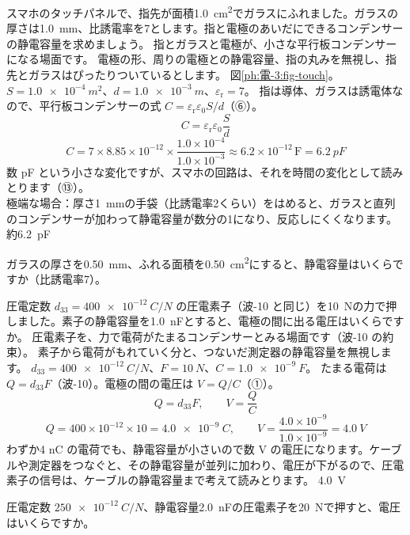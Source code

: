 \label{ph:電-3:ex13}
\begin{phreidai}[タッチパネルの静電容量の変化]
スマホのタッチパネルで、指先が面積\qty{1.0}{cm^2}でガラスにふれました。ガラスの厚さは\qty{1.0}{mm}、比誘電率を7とします。指と電極のあいだにできるコンデンサーの静電容量を求めましょう。
\phbamen
指とガラスと電極が、小さな平行板コンデンサーになる場面です。
\phmushi
電極の形、周りの電極との静電容量、指の丸みを無視し、指先とガラスはぴったりついているとします。
\phzu
図\ref{ph:電-3:fig-touch}。$S=\qty{1.0e-4}{m^2}$、$d=\qty{1.0e-3}{m}$、$\varepsilon_{\mathrm r}=7$。
\phriyu
指は導体、ガラスは誘電体なので、平行板コンデンサーの式 $C=\varepsilon_{\mathrm r}\varepsilon_0S/d$（⑥）。
\phtateru
\[C=\varepsilon_{\mathrm r}\varepsilon_0\frac{S}{d}\]
\phtoku
\[C=7\times8.85\times10^{-12}\times\frac{1.0\times10^{-4}}{1.0\times10^{-3}}\approx6.2\times10^{-12}\,\text{F}=\qty{6.2}{pF}\]
\phtashikame
数 pF という小さな変化ですが、スマホの回路は、それを時間の変化として読みとります（⑬）。\\
極端な場合：厚さ\qty{1}{mm}の手袋（比誘電率2くらい）をはめると、ガラスと直列のコンデンサーが加わって静電容量が数分の1になり、反応しにくくなります。
\kotae 約\qty{6.2}{pF}
\end{phreidai}
\begin{jibun}
ガラスの厚さを\qty{0.50}{mm}、ふれる面積を\qty{0.50}{cm^2}にすると、静電容量はいくらですか（比誘電率7）。
\end{jibun}

\label{ph:電-3:ex14}
\begin{phreidai}[圧電素子に出る電圧]
圧電定数 $d_{33}=\qty{400e-12}{C/N}$ の圧電素子（波-10 と同じ）を\qty{10}{N}の力で押しました。素子の静電容量を\qty{1.0}{nF}とすると、電極の間に出る電圧はいくらですか。
\phbamen
圧電素子を、力で電荷がたまるコンデンサーとみる場面です（波-10 の約束）。
\phmushi
素子から電荷がもれていく分と、つないだ測定器の静電容量を無視します。
\phzu
$d_{33}=\qty{400e-12}{C/N}$、$F=\qty{10}{N}$、$C=\qty{1.0e-9}{F}$。
\phriyu
たまる電荷は $Q=d_{33}F$（波-10）。電極の間の電圧は $V=Q/C$（①）。
\phtateru
\[Q=d_{33}F,\qquad V=\frac{Q}{C}\]
\phtoku
\[Q=400\times10^{-12}\times10=\qty{4.0e-9}{C},\qquad V=\frac{4.0\times10^{-9}}{1.0\times10^{-9}}=\qty{4.0}{V}\]
\phtashikame
わずか4 nC の電荷でも、静電容量が小さいので数 V の電圧になります。ケーブルや測定器をつなぐと、その静電容量が並列に加わり、電圧が下がるので、圧電素子の信号は、ケーブルの静電容量まで考えて読みとります。
\kotae \qty{4.0}{V}
\end{phreidai}
\begin{jibun}
圧電定数 $\qty{250e-12}{C/N}$、静電容量\qty{2.0}{nF}の圧電素子を\qty{20}{N}で押すと、電圧はいくらですか。
\end{jibun}

